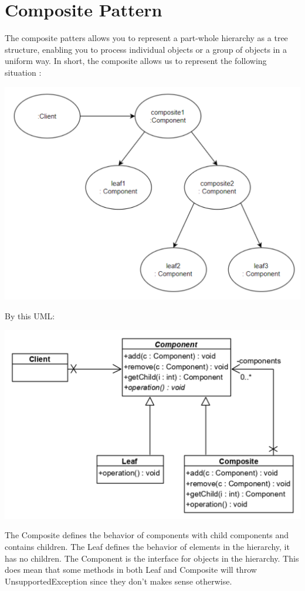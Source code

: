 \documentclass{report}
\begin{document}
   		\section{Composite Pattern}
   			The composite patters allows you to represent a part-whole hierarchy as a tree structure, enabling you to process individual objects or a group of objects in a uniform way. In short, the composite allows us to represent the following situation : 
   			\begin{center}
   				\includegraphics[scale=0.3]{composite_irl}
   			\end{center} 
   			By this UML: 
   			\begin{center}
   				\includegraphics[scale=0.3]{composite_uml}
   			\end{center} 
   			The Composite defines the behavior of components with child components and contains children. The Leaf defines the behavior of elements in the hierarchy, it has no children. The Component is the interface for objects in the hierarchy. This does mean that some methods in both Leaf and Composite will throw UnsupportedException since they don't makes sense otherwise.
\end{document}
